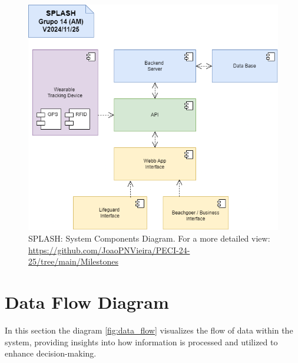 \begin{figure}[H]
      \centering
      \includegraphics[width=16cm]{figs/componets.png}
      \caption{SPLASH: System Components Diagram. For a more detailed view: \url{https://github.com/JoaoPNVieira/PECI-24-25/tree/main/Milestones}}
      \label{fig:componets}
\end{figure}

\newpage
\section{Data Flow Diagram}
In this section the diagram \ref{fig:data_flow} visualizes the flow of data within the system, providing insights into how information is processed and utilized to enhance decision-making.

